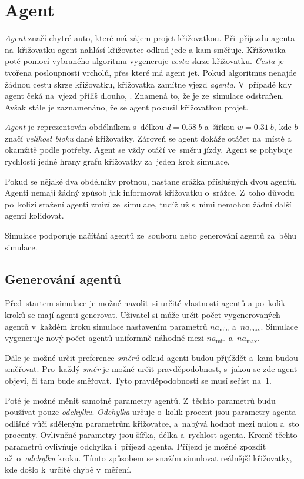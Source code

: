 \section{Agent}\label{sec:agent}

\emph{Agent} značí chytré auto, které má zájem projet křižovatkou.
Při~příjezdu agenta na~křižovatku agent nahlásí křižovatce odkud jede a kam směřuje.
Křižovatka poté pomocí vybraného algoritmu vygeneruje \emph{cestu} skrze křižovatku.
\emph{Cesta} je tvořena posloupností vrcholů, přes které má agent jet.
Pokud algoritmus nenajde žádnou cestu skrze křižovatku, křižovatka zamítne vjezd \emph{agenta}.
V~případě kdy agent čeká na~vjezd příliš dlouho, .
Znamená to, že je ze~simulace odstraňen.
Avšak stále je zaznamenáno, že se agent pokusil křižovatkou projet.

\emph{Agent} je reprezentován obdélníkem s~délkou $d=0.58~b$ a~šířkou $w=0.31~b$,
kde $b$ značí \emph{velikost bloku} dané křižovatky.
Zároveň se agent dokáže otáčet na~místě a okamžitě podle potřeby.
Agent se vždy otáčí ve~směru jízdy.
Agent se pohybuje rychlostí jedné hrany grafu křižovatky za~jeden krok simulace.

Pokud se nějaké dva obdélníky protnou, nastane srážka příslušných dvou agentů.
Agenti nemají žádný způsob jak informovat křižovatku o~srážce.
Z~toho důvodu po~kolizi sražení agenti zmizí ze~simulace, tudíž už s~nimi nemohou žádní další agenti kolidovat.

Simulace podporuje načítání agentů ze~souboru nebo generování agentů za~běhu simulace.

\subsection{Generování agentů}\label{subsec:generovani-agentu}

Před~startem simulace je možné navolit~si určité vlastnosti agentů a po~kolik kroků se mají agenti generovat.
Uživatel si může určit počet vygenerovaných agentů v~každém kroku simulace nastavením parametrů $na_{\min}$ a~$na_{\max}$.
Simulace vygeneruje nový počet agentů uniformně náhodně mezi $na_{\min}$ a~$na_{\max}$.

Dále je možné určit preference \emph{směrů} odkud agenti budou přijíždět a~kam budou směřovat.
Pro~každý \emph{směr} je možné určit pravděpodobnost, s~jakou se zde agent objeví, či tam bude směřovat.
Tyto pravděpodobnosti se musí sečíst na~$1$.

Poté je možné měnit samotné parametry agentů.
Z~těchto parametrů budu používat pouze \emph{odchylku}.
\emph{Odchylka} určuje o~kolik procent jsou parametry agenta odlišné vůči sděleným parametrům křižovatce,
a~nabývá hodnot mezi nulou a~sto procenty.
Ovlivněné parametry jsou šířka, délka a~rychlost agenta.
Kromě těchto parametrů ovlivňuje odchylka i~příjezd agenta.
Příjezd je možné zpozdit až~o~\emph{odchylku} kroku.
Tímto způsobem se snažím simulovat reálnější křižovatky, kde došlo k~určité chybě v~měření.
